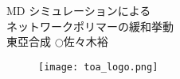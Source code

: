 \begin{minipage}[]{0.75\columnwidth}
	\centering
		\Huge MD シミュレーションによる\\ネットワークポリマーの緩和挙動  \\[10mm]
		\Large 東亞合成 $\bigcirc$佐々木裕 \\
	\end{minipage}
	\begin{minipage}[]{0.2\columnwidth}
		\begin{figure}\centering
			\texttt{[image: toa\_logo.png]}
		\end{figure}
	\end{minipage}